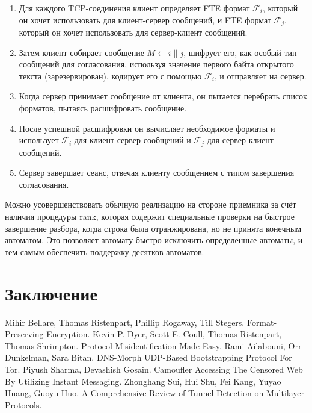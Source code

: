 \begin{enumerate}
    \item Для каждого TCP-соединения клиент определяет FTE формат $\mathcal{F}_i$,
          который он хочет использовать для клиент-сервер сообщений, и FTE формат $\mathcal{F}_j$,
          который он хочет использовать для сервер-клиент сообщений.
    \item Затем клиент собирает сообщение $M \leftarrow i \| j$, шифрует его,
          как особый тип сообщений для согласования, используя значение первого байта открытого текста (зарезервирован),
          кодирует его с помощью $\mathcal{F}_i$, и отправляет на сервер.
    \item Когда сервер принимает сообщение от клиента, он пытается перебрать список форматов, пытаясь расшифровать сообщение.
    \item После успешной расшифровки он вычисляет необходимое форматы и использует $\mathcal{F}_i$
          для клиент-сервер сообщений и $\mathcal{F}_j$ для сервер-клиент сообщений.
    \item Сервер завершает сеанс, отвечая клиенту сообщением с типом завершения согласования.
\end{enumerate}

Можно усовершенствовать обычную реализацию на стороне приемника за счёт наличия процедуры rank,
которая содержит специальные проверки на быстрое завершение разбора, когда строка была отранжирована, но не принята конечным автоматом.
Это позволяет автомату быстро исключить определенные автоматы, и тем самым обеспечить поддержку десятков автоматов.

\section{Заключение}

\newpage

\begin{thebibliography}{9}
\bibitem {} Mihir Bellare, Thomas Ristenpart, Phillip Rogaway, Till Stegers. Format-Preserving Encryption.
\bibitem {} Kevin P. Dyer, Scott E. Coull, Thomas Ristenpart, Thomas Shrimpton. Protocol Misidentification Made Easy.
\bibitem {} Rami Ailabouni, Orr Dunkelman, Sara Bitan. DNS-Morph UDP-Based Bootstrapping Protocol For Tor.
\bibitem {} Piyush Sharma, Devashish Gosain. Camoufler Accessing The Censored Web By Utilizing Instant Messaging.
\bibitem {} Zhonghang Sui, Hui Shu, Fei Kang, Yuyao Huang, Guoyu Huo. A Comprehensive Review of Tunnel Detection on Multilayer Protocols.
\end{thebibliography}



